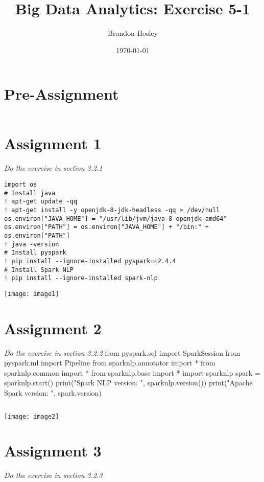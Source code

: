 \documentclass[]{article}
\title{Big Data Analytics: Exercise 5-1}
\author{Brandon Hosley}
\date{\today}
\begin{document}
\maketitle

\section*{Pre-Assignment}
\begin{verbatim}
\end{verbatim}

\section*{Assignment 1}
\emph{ Do the exercise in section 3.2.1 }

\begin{verbatim}
import os
# Install java
! apt-get update -qq
! apt-get install -y openjdk-8-jdk-headless -qq > /dev/null
os.environ["JAVA_HOME"] = "/usr/lib/jvm/java-8-openjdk-amd64"
os.environ["PATH"] = os.environ["JAVA_HOME"] + "/bin:" + os.environ["PATH"]
! java -version
# Install pyspark
! pip install --ignore-installed pyspark==2.4.4
# Install Spark NLP
! pip install --ignore-installed spark-nlp
\end{verbatim}
\texttt{[image: image1]} %


\section*{Assignment 2}
\emph{ Do the exercise in section 3.2.2 }
from pyspark.sql import SparkSession
from pyspark.ml import Pipeline
from sparknlp.annotator import *
from sparknlp.common import *
from sparknlp.base import *
import sparknlp
spark = sparknlp.start()
print("Spark NLP version: ", sparknlp.version())
print("Apache Spark version: ", spark.version)
\begin{verbatim}

\end{verbatim}
\texttt{[image: image2]} %


\section*{Assignment 3}
\emph{ Do the exercise in section 3.2.3 }
\end{document}
